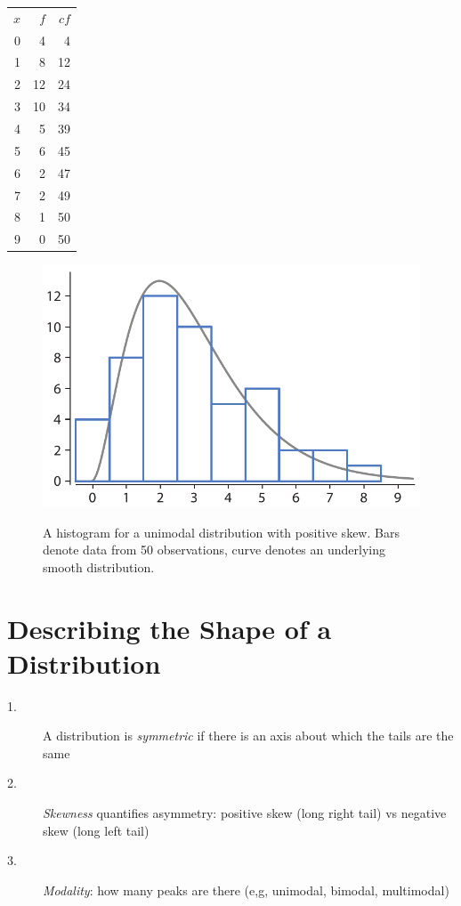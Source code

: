 \documentclass{tufte-handout}
\begin{document}
\begin{margintable}[4.0in]
  \centering
  \selectfont
  \begin{tabular}{rrr}
    \toprule
    $x$ & $f$ & $cf$\\
     0  &   4 &    4\\
     1  &   8 &   12\\
     2 &   12&    24\\
     3 &   10&    34\\
     4 &    5 &   39\\
     5 &    6 &   45\\
     6 &    2 &   47\\
     7 &    2 &   49\\
     8 &    1 &   50\\
     9 &    0 &   50\\
    \bottomrule
  \end{tabular}
  \label{tab:normaltab}
\end{margintable}

\begin{figure}%
  \includegraphics[width=\linewidth]{handout1_hist}%
  \label{fig:fullfig}%
  \caption{A histogram for a unimodal distribution with positive skew. Bars denote data from 50 observations, curve denotes an underlying smooth distribution.}
\end{figure}

\section{Describing the Shape of a Distribution}
\begin{fullwidth}
\begin{description}
\item[1.] A distribution is \emph{symmetric} if there is an axis about which the tails are the same\\
\item[2.] \emph{Skewness} quantifies asymmetry: positive skew (long right tail) vs negative skew (long left tail)\\
\item[3.] \emph{Modality}: how many peaks are there (e,g, unimodal, bimodal, multimodal)\\
\end{description}
\end{fullwidth}
\end{document}
